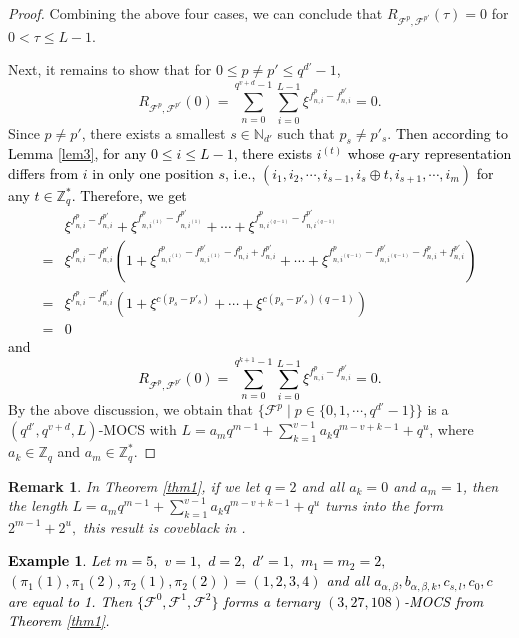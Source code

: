 \documentclass[11pt]{article}
\newcommand{\2} {$2$-to-$1$}
\newtheorem{ex}[thm]{\bfseries   Example}
\newtheorem{rem}[thm]{\bfseries   Remark}
\begin{document}
\begin{proof}
	Combining the above four cases, we can conclude that $R_{\mathcal{F}^{p},\mathcal{F}^{p'}}(\tau)=0$ for $0<\tau\leq L-1$.
	
	 Next, it remains to show that for $0\leq p\neq p' \leq q^{d'}-1$, $$R_{\mathcal{F}^{p},\mathcal{F}^{p'}}(0)=\sum^{q^{v+d}-1}_{n=0}\sum^{L-1}_{i=0}{\xi}^{f^{p}_{n,i}-f^{p'}_{n,i}}=0.$$
	Since $p\neq p'$, there exists a smallest $s\in \mathbb{N}_{d'}$ such that $p_{s}\neq p'_{s}$. \textcolor{black}{Then according to Lemma \ref{lem3},
		for any $0\leq i\leq L-1$, there exists $i^{(t)}$ whose $q$-ary representation differs from $i$ in only one position $s$, i.e., $(i_1,i_2,\cdots,i_{s-1},i_s\oplus t,i_{s+1},\cdots,i_m)$ for any $t\in \mathbb{Z}^{*}_{q}$. Therefore, we get
		\begin{align*}
			&\xi^{f^{p}_{n,i}-f^{p'}_{n,i}}+
			\xi^{f^{p}_{n,i^{(1)}}-f^{p'}_{n,i^{(1)}}}+ \cdots +
			\xi^{f^{p}_{n,i^{(q-1)}}-f^{p'}_{n,i^{(q-1)}}}\\
			=&\xi^{f^{p}_{n,i}-f^{p'}_{n,i}}\left( 1+\xi^{f^{p}_{n,i^{(1)}}-f^{p'}_{n,i^{(1)}}-f^{p}_{n,i}+f^{p'}_{n,i}}+\cdots +
			\xi^{f^{p}_{n,i^{(q-1)}}-f^{p'}_{n,i^{(q-1)}}-f^{p}_{n,i}+f^{p'}_{n,i}}\right)\\
			=& \xi^{f^{p}_{n,i}-f^{p'}_{n,i}}\left(1+\xi^{c(p_{s}-p'_{s})}+\cdots+\xi^{c(p_{s}-p'_{s})(q-1)} \right)\\
			=&0
		\end{align*}
		and
		$$R_{\mathcal{F}^{p},\mathcal{F}^{p'}}(0)=\sum^{q^{k+1}-1}_{n=0}\sum^{L-1}_{i=0}{\xi}^{f^{p}_{n,i}-f^{p'}_{n,i}}=0.$$
	}
	By the above discussion, we obtain that  $\{\mathcal{F}^{p}\mid p\in \{0,1,\cdots,q^{d'}-1\} \}$ is a $(q^{d'},q^{v+d},L)$-MOCS with $L=a_mq^{m-1}+\sum^{v-1}_{k=1}a_{k}q^{m-v+k-1}+q^{u}$, where $ a_{k}\in \mathbb{Z}_q$ and  $a_m\in \mathbb{Z}^*_q$.
	
\end{proof}
\begin{rem}
	In Theorem \ref{thm1}, if we let $q=2$ and all $a_{k}=0$ and $a_m=1$, then the length $L=a_mq^{m-1}+\sum^{v-1}_{k=1}a_{k}q^{m-v+k-1}+q^{u}$ turns into the form $2^{m-1}+2^{u},$ this result is coveblack in \cite{SW}.
\end{rem}

\textcolor{black}{\begin{ex}
			Let $m=5, $  $v=1, $  $d=2, $ $d'=1,$ $m_1=m_2=2, $  $(\pi_{1}(1),\pi_{1}(2),\pi_{2}(1),\pi_{2}(2))=(1,2,3,4)  $ and all $a_{\alpha,\beta}, b_{\alpha,\beta,k}, c_{s,l}, c_0,c$ are equal to 1. Then   $\{\mathcal{F}^{0},\mathcal{F}^{1},\mathcal{F}^{2}\}$ forms a  ternary $(3,27,108)$-MOCS from Theorem \ref{thm1}.	
\end{ex}}
\end{document}
